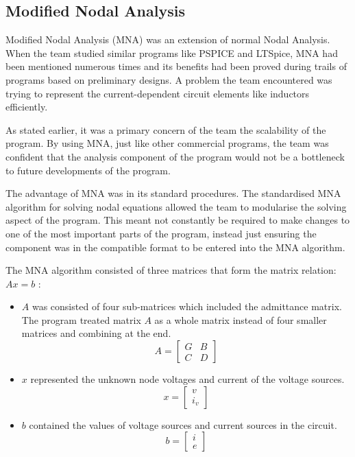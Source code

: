 \documentclass[12pt,a4paper]{article}
\begin{document}
	\subsection{Modified Nodal Analysis}
	Modified Nodal Analysis (MNA) was an extension of normal Nodal Analysis. When the team studied similar 
	programs like PSPICE and LTSpice, MNA had been mentioned numerous times \cite{MNA} and its benefits had been proved during
	trails of programs based on preliminary designs. A problem the team encountered was trying to 
	represent the current-dependent circuit elements like inductors efficiently. 
	\par
	As stated earlier, it was a primary concern of the team the scalability of the program. By using MNA, just like
	other commercial programs, the team was confident that the analysis component of the program would not be a 
	bottleneck to future developments of the program.
	\par
	The advantage of MNA was in its standard procedures. The standardised MNA algorithm for solving nodal 
	equations allowed the team to modularise the solving aspect of the program. This meant not constantly be required to 
	make changes to one of the most important parts of the program, instead just ensuring the component was in the 
	compatible format to be entered into the MNA algorithm.
	\par 
	The MNA algorithm consisted of three matrices that form the matrix relation: $Ax=b$ \cite{MNA}:
	\begin{itemize}
		\item $A$ was consisted of four sub-matrices which included the admittance matrix. The program treated matrix $A$ as 
		a whole matrix instead of four smaller matrices and combining at the end.
		$$ A =
		\begin{bmatrix}
			G & B\\
			C & D 
		\end{bmatrix} $$

		\item $x$ represented the unknown node voltages and current of the voltage sources.
		$$ x =
		\begin{bmatrix}
			v \\
			i_{v} 
		\end{bmatrix} $$

		\item $b$ contained the values of voltage sources and current sources in the circuit.
		$$ b =
		\begin{bmatrix}
			i \\
			e 
		\end{bmatrix} $$

	\end{itemize}
\end{document}
